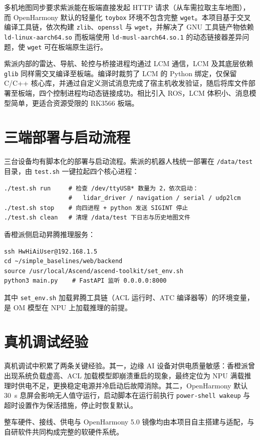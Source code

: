 多机地图同步要求紫派能在板端直接发起 HTTP 请求（从车需拉取主车地图），而 OpenHarmony 默认的轻量化 \texttt{toybox} 环境不包含完整 \texttt{wget}。本项目基于交叉编译工具链，依次构建 \texttt{zlib}、\texttt{openssl} 与 \texttt{wget}，并解决了 GNU 工具链产物依赖 \texttt{ld-linux-aarch64.so} 而板端使用 \texttt{ld-musl-aarch64.so.1} 的动态链接器差异问题，使 \texttt{wget} 可在板端原生运行。

紫派内部的雷达、导航、轮控与桥接进程均通过 LCM 通信，LCM 及其底层依赖 \texttt{glib} 同样需交叉编译至板端。编译时裁剪了 LCM 的 Python 绑定，仅保留 C/C++ 核心库，并通过自定义测试消息完成了宿主机收发验证，随后将库文件部署至板端，四个控制进程均动态链接成功。相比引入 ROS，LCM 体积小、消息模型简单，更适合资源受限的 RK3566 板端。

\section{三端部署与启动流程}
\label{sec:deployment}

三台设备均有脚本化的部署与启动流程。紫派的机器人栈统一部署在 \texttt{/data/test} 目录，由 \texttt{test.sh} 一键拉起四个核心进程：

\begin{lstlisting}
./test.sh run     # 检查 /dev/ttyUSB* 数量为 2，依次启动：
                  #   lidar_driver / navigation / serial / udp2lcm
./test.sh stop    # 向四进程 + python 发送 SIGINT 停止
./test.sh clean   # 清理 /data/test 下日志与历史地图文件
\end{lstlisting}

香橙派侧启动昇腾推理服务：

\begin{lstlisting}
ssh HwHiAiUser@192.168.1.5
cd ~/simple_baselines/web/backend
source /usr/local/Ascend/ascend-toolkit/set_env.sh
python3 main.py    # FastAPI 监听 0.0.0.0:8000
\end{lstlisting}

其中 \texttt{set\_env.sh} 加载昇腾工具链（ACL 运行时、ATC 编译器等）的环境变量，是 OM 模型在 NPU 上加载推理的前提。

\section{真机调试经验}
\label{sec:debugging}

真机调试中积累了两条关键经验。其一，边缘 AI 设备对供电质量敏感：香橙派曾出现系统负载虚高、ACL 加载模型即崩溃重启的现象，最终定位为 NPU 满载推理时供电不足，更换稳定电源并冷启动后故障消除。其二，OpenHarmony 默认 30~s 息屏会影响无人值守运行，启动脚本在运行前执行 \texttt{power-shell wakeup} 与超时设置作为保活措施，停止时恢复默认。

整车硬件、接线、供电与 OpenHarmony 5.0 镜像均由本项目自主搭建与适配，与自研软件共同构成完整的软硬件系统。
